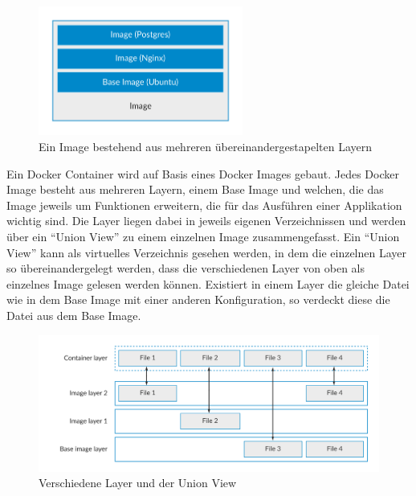 \begin{figure}[!ht]
  \centering
  \includegraphics[width=0.6\textwidth]{images/9-docker-image.png}
  \caption{Ein Image bestehend aus mehreren übereinandergestapelten Layern \cite{7158965}}
\end{figure}

Ein Docker Container wird auf Basis eines Docker Images gebaut. Jedes Docker Image besteht aus mehreren Layern, einem Base Image und welchen, die das Image jeweils um Funktionen erweitern, die für das Ausführen einer Applikation wichtig sind. Die Layer liegen dabei in jeweils eigenen Verzeichnissen und werden über ein “Union View” zu einem einzelnen Image zusammengefasst. Ein “Union View” kann als virtuelles Verzeichnis gesehen werden, in dem die einzelnen Layer so übereinandergelegt werden, dass die verschiedenen Layer von oben als einzelnes Image gelesen werden können. Existiert in einem Layer die gleiche Datei wie in dem Base Image mit einer anderen Konfiguration, so verdeckt diese die Datei aus dem Base Image.\\

\begin{figure}[!ht]
  \centering
  \includegraphics[width=1\textwidth]{images/union.png}
  \caption{Verschiedene Layer und der Union View \cite{docker:aufs}}
\end{figure}

